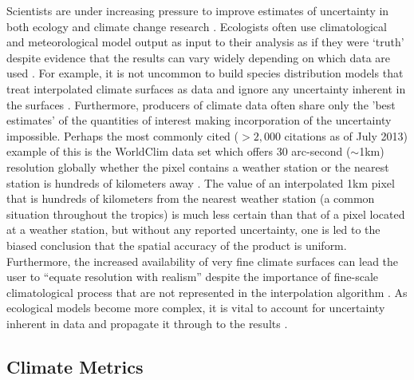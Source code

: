 \documentclass[12pt]{article}
\begin{document}
Scientists are under increasing pressure to improve estimates of
uncertainty in both ecology
\citep[\textit{e.g.}][]{cressie_accounting_2009} and climate change research \citep[\textit{e.g.}][]{collins_towards_2006}.  
Ecologists often use climatological and meteorological model output
as input to their analysis as if they
were `truth' despite evidence that the results can vary widely
depending on which data are used
\citep{soria-auza_impact_2010,roubicek_does_2010,peterson_environmental_2008,wiens_niches_2009}. 
For example, it is not uncommon to build species
distribution models that treat interpolated climate surfaces as data and ignore any
uncertainty inherent in the surfaces \citep[\textit{e.g.}][]{raes_botanical_2009,williams_using_2009,ward_modelling_2007,pearson_predicting_2007}. 
Furthermore, producers of climate data often share only the 'best estimates' of
the quantities of interest \citep{daly_guidelines_2006} making incorporation of the uncertainty
impossible.  Perhaps the most commonly cited ($>2,000$
citations as of July 2013) example of this
is the WorldClim data set which offers 30
arc-second ($\sim$1km) resolution globally whether
the pixel contains a weather station or the nearest station is
hundreds of kilometers away \citep{hijmans_very_2005}.  
The value of an interpolated 1km pixel that is hundreds of
kilometers from the nearest weather station (a common situation
throughout the tropics) is much less certain than that of
a pixel  located at a weather station, but without any reported
uncertainty,  one is led to the  biased conclusion that the spatial
accuracy of the product is uniform.   Furthermore, the increased
availability of very fine climate surfaces can lead the user to ``equate resolution with realism''
despite the importance of fine-scale
climatological process that are not represented in the interpolation
algorithm \citep{daly_guidelines_2006}.
As ecological models become more complex, it is vital to account for
uncertainty inherent in data and propagate it through to
the results \citep{luo_ecological_2011,clark_future_2006}.

\subsection{Climate Metrics}
\end{document}
